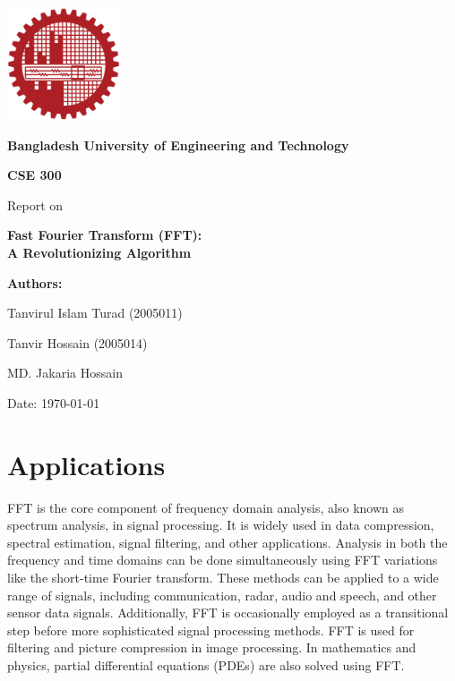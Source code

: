 \documentclass{report}
\begin{document}
\begin{titlepage}
    \centering
    \vspace*{2cm}
    \includegraphics[width=0.25\textwidth]{buet.png}\\
    \vspace{1.5cm}
    {\Large \textbf{Bangladesh University of Engineering and Technology} \par}
    \vspace{2cm}
    {\LARGE \textbf{CSE 300} \par}
    \vspace{1cm}
    {\Large Report on \par}
    \vspace{0.5cm}
    {\LARGE \textbf{Fast Fourier Transform (FFT):\\[0.5em] A Revolutionizing Algorithm} \par}
    \vspace{1.5cm}
    {\large \textbf{Authors:} \par}
    \vspace{0.5cm}
    {\large Tanvirul Islam Turad (2005011) \par}
    {\large Tanvir Hossain (2005014) \par}
    {\large MD. Jakaria Hossain\par}
    \vspace{2cm}
    {\large Date: \today \par}
\end{titlepage}

\tableofcontents

\newpage
\chapter{Applications}
FFT is the core component of frequency domain analysis, also known as spectrum analysis, in signal processing. It is widely used in data compression, spectral estimation, signal filtering, and other applications. Analysis in both the frequency and time domains can be done simultaneously using FFT variations like the short-time Fourier transform. These methods can be applied to a wide range of signals, including communication, radar, audio and speech, and other sensor data signals. Additionally, FFT is occasionally employed as a transitional step before more sophisticated signal processing methods. FFT is used for filtering and picture compression in image processing. In mathematics and physics, partial differential equations (PDEs) are also solved using FFT.
\end{document}
